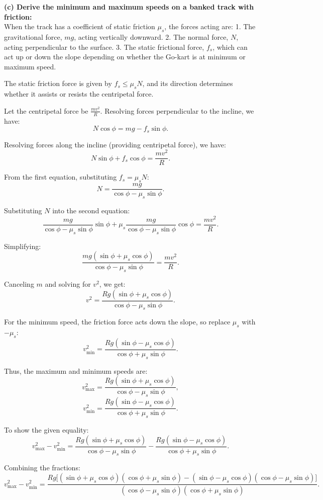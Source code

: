 \textbf{(c) Derive the minimum and maximum speeds on a banked track with friction:} \\[1em]
When the track has a coefficient of static friction $\mu_s$, the forces acting are:
1. The gravitational force, $mg$, acting vertically downward.
2. The normal force, $N$, acting perpendicular to the surface.
3. The static frictional force, $f_s$, which can act up or down the slope depending on whether the Go-kart is at minimum or maximum speed.

The static friction force is given by $f_s \leq \mu_s N$, and its direction determines whether it assists or resists the centripetal force.

Let the centripetal force be $\frac{mv^2}{R}$. Resolving forces perpendicular to the incline, we have:
\[
N\cos\phi = mg - f_s\sin\phi.
\]

Resolving forces along the incline (providing centripetal force), we have:
\[
N\sin\phi + f_s\cos\phi = \frac{mv^2}{R}.
\]

From the first equation, substituting $f_s = \mu_s N$:
\[
N = \frac{mg}{\cos\phi - \mu_s \sin\phi}.
\]

Substituting $N$ into the second equation:
\[
\frac{mg}{\cos\phi - \mu_s \sin\phi} \sin\phi + \mu_s \frac{mg}{\cos\phi - \mu_s \sin\phi} \cos\phi = \frac{mv^2}{R}.
\]

Simplifying:
\[
\frac{mg (\sin\phi + \mu_s \cos\phi)}{\cos\phi - \mu_s \sin\phi} = \frac{mv^2}{R}.
\]

Canceling $m$ and solving for $v^2$, we get:
\[
v^2 = \frac{Rg (\sin\phi + \mu_s \cos\phi)}{\cos\phi - \mu_s \sin\phi}.
\]

For the minimum speed, the friction force acts down the slope, so replace $\mu_s$ with $-\mu_s$:
\[
v_{\text{min}}^2 = \frac{Rg (\sin\phi - \mu_s \cos\phi)}{\cos\phi + \mu_s \sin\phi}.
\]

Thus, the maximum and minimum speeds are:
\[
v_{\text{max}}^2 = \frac{Rg (\sin\phi + \mu_s \cos\phi)}{\cos\phi - \mu_s \sin\phi},
\]
\[
v_{\text{min}}^2 = \frac{Rg (\sin\phi - \mu_s \cos\phi)}{\cos\phi + \mu_s \sin\phi}.
\]

To show the given equality:
\[
v_{\text{max}}^2 - v_{\text{min}}^2 = \frac{Rg (\sin\phi + \mu_s \cos\phi)}{\cos\phi - \mu_s \sin\phi} - \frac{Rg (\sin\phi - \mu_s \cos\phi)}{\cos\phi + \mu_s \sin\phi}.
\]

Combining the fractions:
\[
v_{\text{max}}^2 - v_{\text{min}}^2 = \frac{Rg \big[(\sin\phi + \mu_s \cos\phi)(\cos\phi + \mu_s \sin\phi) - (\sin\phi - \mu_s \cos\phi)(\cos\phi - \mu_s \sin\phi)\big]}{(\cos\phi - \mu_s \sin\phi)(\cos\phi + \mu_s \sin\phi)}.
\]

